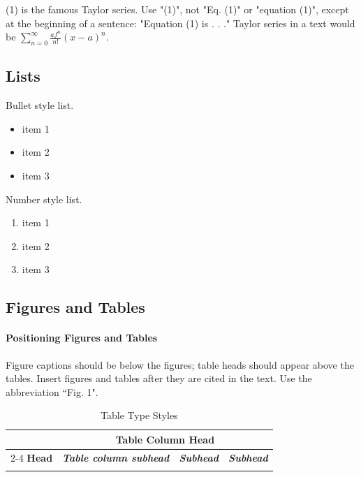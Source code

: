 \documentclass{article}
\begin{document}
\noindent
(1) is the famous Taylor series. Use "(1)", not "Eq. (1)" or "equation (1)", except at the beginning of a sentence: "Equation (1) is . . ."
\newline
\indent
Taylor series in a text would be $\sum_{n=0}^\infty \frac {af^n}{n!}{(x-a)^n}$.

\subsection{Lists}
Bullet style list.
\begin{itemize}
    \item item 1
    \item item 2
    \item item 3
\end{itemize}

Number style list.
\begin{enumerate}
    \item item 1
    \item item 2
    \item item 3
\end{enumerate}

\subsection{Figures and Tables}
\paragraph{Positioning Figures and Tables} Figure captions should be below the figures; table heads should appear above the tables. Insert figures and tables after they are cited in the text. Use the abbreviation ``Fig. 1".




\begin{table}[h]

\caption{Table Type Styles}
\begin{center}
\begin{tabular}{|c||c|c|c|}
\hline
\multirow{2}{*}{}\textbf{Table} & \multicolumn{3}{c|}{\textbf{Table Column Head}}\\ \cline{2-4} \textbf{Head} & \emph{\textbf{Table column subhead}} & \emph{\textbf{Subhead}} & \emph{\textbf{Subhead}} \\ \hline
     &  &  & \\ \hline
\end{tabular}
\end{center}
\end{table}
\end{document}
